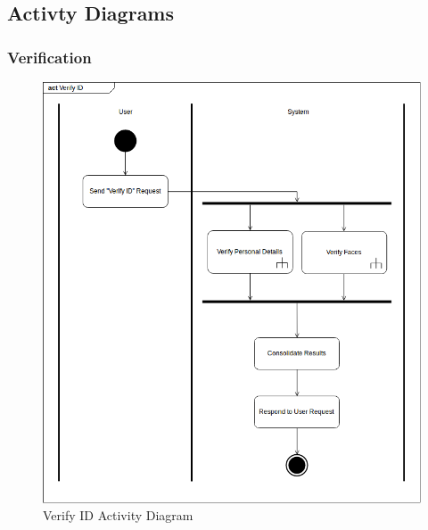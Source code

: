 \documentclass{article}
\begin{document}
\subsection{Activty Diagrams}
\subsubsection{Verification}
	\begin{figure}[h]
		\centering
		\includegraphics[scale=0.4]{img/verify_id_activity.png}
		\caption{Verify ID Activity Diagram}
	\end{figure}
\pagebreak
\end{document}
